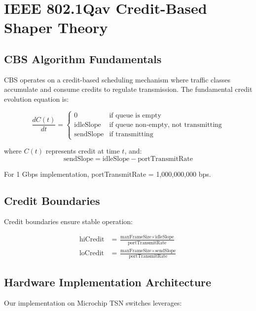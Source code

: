 \documentclass[10pt, journal, compsoc]{IEEEtran}
\begin{document}
\section{IEEE 802.1Qav Credit-Based Shaper Theory}

\subsection{CBS Algorithm Fundamentals}

CBS operates on a credit-based scheduling mechanism where traffic classes accumulate and consume credits to regulate transmission. The fundamental credit evolution equation is:

\begin{equation}
\frac{dC(t)}{dt} = \begin{cases}
0 & \text{if queue is empty} \\
\text{idleSlope} & \text{if queue non-empty, not transmitting} \\
\text{sendSlope} & \text{if transmitting}
\end{cases}
\end{equation}

where $C(t)$ represents credit at time $t$, and:
\begin{equation}
\text{sendSlope} = \text{idleSlope} - \text{portTransmitRate}
\end{equation}

For 1 Gbps implementation, portTransmitRate = 1,000,000,000 bps.

\subsection{Credit Boundaries}

Credit boundaries ensure stable operation:

\begin{align}
\text{hiCredit} &= \frac{\text{maxFrameSize} \times \text{idleSlope}}{\text{portTransmitRate}} \\
\text{loCredit} &= \frac{\text{maxFrameSize} \times \text{sendSlope}}{\text{portTransmitRate}}
\end{align}

\subsection{Hardware Implementation Architecture}

Our implementation on Microchip TSN switches leverages:
\end{document}
